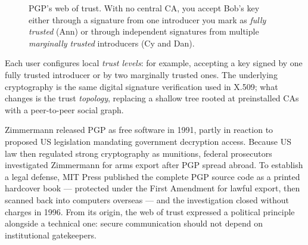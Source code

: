 \begin{figure}[htbp]
\centering
{}
\caption{PGP's web of trust. With no central CA, you accept Bob's key either through a signature from one introducer you mark as \emph{fully trusted} (Ann) or through independent signatures from multiple \emph{marginally trusted} introducers (Cy and Dan).}
\label{fig:ch24-wot}
\end{figure}

Each user configures local \emph{trust levels}: for example, accepting a key signed by one fully trusted introducer or by two marginally trusted ones. The underlying cryptography is the same digital signature verification used in X.509; what changes is the trust \emph{topology}, replacing a shallow tree rooted at preinstalled CAs with a peer-to-peer social graph.

Zimmermann released PGP as free software in 1991, partly in reaction to proposed US legislation mandating government decryption access. Because US law then regulated strong cryptography as munitions, federal prosecutors investigated Zimmermann for arms export after PGP spread abroad. To establish a legal defense, MIT Press published the complete PGP source code as a printed hardcover book --- protected under the First Amendment for lawful export, then scanned back into computers overseas --- and the investigation closed without charges in 1996. From its origin, the web of trust expressed a political principle alongside a technical one: secure communication should not depend on institutional gatekeepers.

